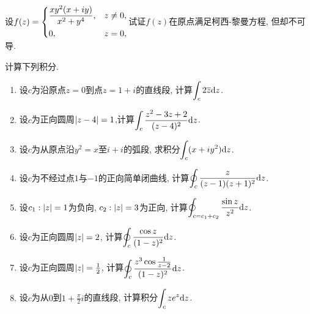 \begin{yyEx}
	设$
	\begin{lgathered}
	f(z) = \begin{dcases}
	\frac{xy^2(x+iy)}{x^2+y^4}, &z\neq 0,\\
	0,&z=0,
	\end{dcases}
	\end{lgathered}
	$试证$f(z)$在原点满足柯西-黎曼方程, 但却不可导.
\end{yyEx}

\begin{yyEx}
	计算下列积分.
	\begin{enumerate}
		\item 设$c$为沿原点$z = 0$到点$z = 1+i$的直线段, 计算$\begin{lgathered}\int_c2\overline{z}\mathrm{d}z\end{lgathered}$.
		\item 设$c$为正向圆周$\lvert z-4\rvert = 1$,计算$\begin{lgathered}\int_c \frac{z^2-3z+2}{(z-4)^2}\mathrm{d}z\end{lgathered}$.
		\item 设$c$为从原点沿$y^2 = x$至$i+i$的弧段, 求积分$\begin{lgathered}\int_c(x+iy^2)\mathrm{d}z\end{lgathered}$.
		\item 设$c$为不经过点$1$与$-1$的正向简单闭曲线, 计算$\begin{lgathered}\oint_c\frac{z}{(z-1)(z+1)^2}\mathrm{d}z\end{lgathered}$.
		\item 设$c_1:\lvert z\rvert = 1$为负向, $c_2:\lvert z\rvert = 3$为正向, 计算$\begin{lgathered}\oint_{c=c_1+c_2}\frac{\sin z}{z^2}\mathrm{d}z\end{lgathered}$.
		\item 设$c$为正向圆周$\lvert z\rvert = 2$, 计算$\begin{lgathered}\oint_c\frac{\cos z}{(1-z)^2}\mathrm{d}z\end{lgathered}$.
		\item 设$c$为正向圆周$\lvert z\rvert = \frac{1}{2}$, 计算$\begin{lgathered}\oint_c\frac{z^3\cos \frac{1}{z-2}}{(1-z)^2}\mathrm{d}z\end{lgathered}$.
		\item 设$c$为从$0$到$1+\frac{\pi}{2}i$的直线段, 计算积分$\begin{lgathered}\int_cze^z\mathrm{d}z\end{lgathered}$.

\end{enumerate}
\end{yyEx}
